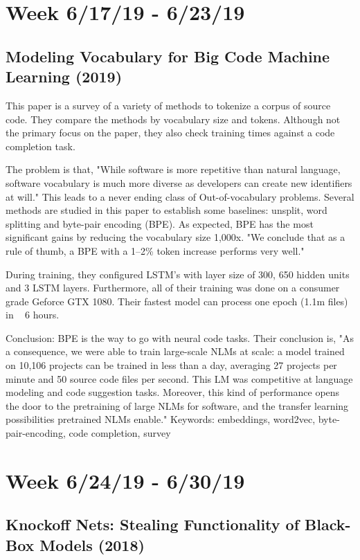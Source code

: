 \documentclass{article}
\begin{document}
\section*{Week 6/17/19 - 6/23/19}
\subsection*{Modeling Vocabulary for Big Code Machine Learning (2019)\cite{babii2019modeling}}

This paper is a survey of a variety of methods to tokenize a corpus of source code. They compare the methods by vocabulary size and tokens. Although not the primary focus on the paper, they also check training times against a code completion task.

The problem is that, "While software is more repetitive than natural language, software vocabulary is much more diverse as developers can create new identifiers at will." This leads to a never ending class of Out-of-vocabulary problems. Several methods are studied in this paper to establish some baselines: unsplit, word splitting and byte-pair encoding (BPE). As expected, BPE has the most significant gains by reducing the vocabulary size 1,000x. "We conclude that as a rule of thumb, a BPE with a 1–2\% token increase performs very well."

During training, they configured LSTM's with layer size of 300, 650 hidden units and 3 LSTM layers. Furthermore, all of their training was done on a consumer grade Geforce GTX 1080. Their fastest model can process one epoch (1.1m files) in ~ 6 hours.

Conclusion: BPE is the way to go with neural code tasks. Their conclusion is, "As a consequence, we were able to train large-scale NLMs at
scale: a model trained on 10,106 projects can be trained in less than a day, averaging 27 projects per minute and 50 source code files per second. This LM was competitive at language modeling and code suggestion tasks. Moreover, this kind of performance opens the door to the pretraining of large NLMs for software, and the transfer learning possibilities pretrained NLMs enable."
\newline\newline
Keywords: embeddings, word2vec, byte-pair-encoding, code completion, survey


\section*{Week 6/24/19 - 6/30/19}
\subsection*{Knockoff Nets: Stealing Functionality of Black-Box Models (2018)\cite{orekondy2019knockoff}}
\end{document}
